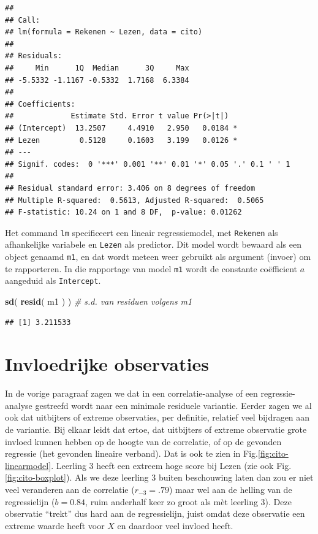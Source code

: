 \documentclass[
]{book}
\newenvironment{Shaded}{\begin{snugshade}}{\end{snugshade}}
\newcommand{\CommentTok}[1]{\textcolor[rgb]{0.56,0.35,0.01}{\textit{#1}}}
\newcommand{\KeywordTok}[1]{\textcolor[rgb]{0.13,0.29,0.53}{\textbf{#1}}}
\newcommand{\NormalTok}[1]{#1}
\begin{document}
\begin{verbatim}
## 
## Call:
## lm(formula = Rekenen ~ Lezen, data = cito)
## 
## Residuals:
##     Min      1Q  Median      3Q     Max 
## -5.5332 -1.1167 -0.5332  1.7168  6.3384 
## 
## Coefficients:
##             Estimate Std. Error t value Pr(>|t|)  
## (Intercept)  13.2507     4.4910   2.950   0.0184 *
## Lezen         0.5128     0.1603   3.199   0.0126 *
## ---
## Signif. codes:  0 '***' 0.001 '**' 0.01 '*' 0.05 '.' 0.1 ' ' 1
## 
## Residual standard error: 3.406 on 8 degrees of freedom
## Multiple R-squared:  0.5613, Adjusted R-squared:  0.5065 
## F-statistic: 10.24 on 1 and 8 DF,  p-value: 0.01262
\end{verbatim}

Het command \texttt{lm} specificeert een lineair regressiemodel, met \texttt{Rekenen}
als afhankelijke variabele en \texttt{Lezen} als predictor. Dit model wordt
bewaard als een object genaamd \texttt{m1}, en dat wordt meteen weer gebruikt
als argument (invoer) om te rapporteren. In die rapportage van model
\texttt{m1} wordt de constante coëfficient \(a\) aangeduid als \texttt{Intercept}.

\begin{Shaded}
\begin{Highlighting}[]
\KeywordTok{sd}\NormalTok{( }\KeywordTok{resid}\NormalTok{( m1 ) ) }\CommentTok{\# s.d. van residuen volgens \textasciigrave{}m1\textasciigrave{}}
\end{Highlighting}
\end{Shaded}

\begin{verbatim}
## [1] 3.211533
\end{verbatim}

\hypertarget{invloedrijke-observaties}{%
\section{Invloedrijke observaties}\label{invloedrijke-observaties}}

In de vorige paragraaf zagen we dat in een correlatie-analyse of een
regressie-analyse gestreefd wordt naar een minimale residuele variantie.
Eerder zagen we al ook dat uitbijters of extreme observaties, per
definitie, relatief veel bijdragen aan de variantie. Bij elkaar leidt
dat ertoe, dat uitbijters of extreme observatie grote invloed kunnen
hebben op de hoogte van de correlatie, of op de gevonden regressie (het
gevonden lineaire verband). Dat is ook te zien in
Fig.\ref{fig:cito-linearmodel}. Leerling 3 heeft een extreem hoge
score bij Lezen (zie ook
Fig.\ref{fig:cito-boxplot}). Als we deze leerling 3 buiten
beschouwing laten dan zou er niet veel veranderen aan de correlatie
(\(r_{-3}=.79\)) maar wel aan de helling van de regressielijn (\(b=0.84\),
ruim anderhalf keer zo groot als mèt leerling 3). Deze observatie
``trekt'' dus hard aan de regressielijn, juist omdat deze observatie een
extreme waarde heeft voor \(X\) en daardoor veel invloed heeft.
\end{document}
